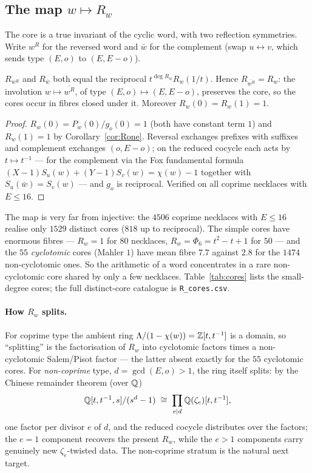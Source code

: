 \subsection*{The map $w\mapsto R_w$}

The core is a true invariant of the cyclic word, with two reflection symmetries. Write $w^{R}$
for the reversed word and $\bar w$ for the complement (swap $u\leftrightarrow v$, which sends
type $(E,o)$ to $(E,E-o)$).

\begin{prop}\label{prop:cores}
$R_{w^{R}}$ and $R_{\bar w}$ both equal the reciprocal $t^{\deg R_w}R_w(1/t)$. Hence
$R_{\overline{w^{R}}}=R_w$: the involution $w\mapsto\overline{w^{R}}$, of type
$(E,o)\mapsto(E,E-o)$, preserves the core, so the cores occur in fibres closed under it. Moreover
$R_w(0)=R_w(1)=1$.
\end{prop}

\begin{proof}
$R_w(0)=P_w(0)/g_o(0)=1$ (both have constant term $1$) and $R_w(1)=1$ by
Corollary~\ref{cor:Rone}. Reversal exchanges prefixes with suffixes and complement exchanges
$(o,E-o)$; on the reduced cocycle each acts by $t\mapsto t^{-1}$ --- for the complement via the
Fox fundamental formula $(X-1)S_u(w)+(Y-1)S_v(w)=\chi(w)-1$ together with $S_u(\bar w)=S_v(w)$
--- and $g_o$ is reciprocal. Verified on all coprime necklaces with $E\le16$.
\end{proof}

The map is very far from injective: the $4506$ coprime necklaces with $E\le16$ realise only
$1529$ distinct cores ($818$ up to reciprocal). The simple cores have enormous fibres ---
$R_w=1$ for $80$ necklaces, $R_w=\Phi_6=t^2-t+1$ for $50$ --- and the $55$ \emph{cyclotomic}
cores (Mahler $1$) have mean fibre $7.7$ against $2.8$ for the $1474$ non-cyclotomic ones. So the
arithmetic of a word concentrates in a rare non-cyclotomic core shared by only a few necklaces.
Table~\ref{tab:cores} lists the small-degree cores; the full distinct-core catalogue is
\texttt{R\_cores.csv}.



\paragraph{How $R_w$ splits.} For coprime type the ambient ring $\Lambda/(1-\chi(w))=\mathbb{Z}[t,t^{-1}]$
is a domain, so ``splitting'' is the factorisation of $R_w$ into cyclotomic factors times a
non-cyclotomic Salem/Pisot factor --- the latter absent exactly for the $55$ cyclotomic cores.
For \emph{non-coprime} type, $d=\gcd(E,o)>1$, the ring itself splits: by the Chinese remainder
theorem (over $\mathbb{Q}$)
\[
   \mathbb{Q}[t,t^{-1},s]/(s^{d}-1)\;\cong\;\prod_{e\mid d}\mathbb{Q}(\zeta_e)[t,t^{-1}],
\]
one factor per divisor $e$ of $d$, and the reduced cocycle distributes over the factors; the
$e=1$ component recovers the present $R_w$, while the $e>1$ components carry genuinely new
$\zeta_e$-twisted data. The non-coprime stratum is the natural next target.
